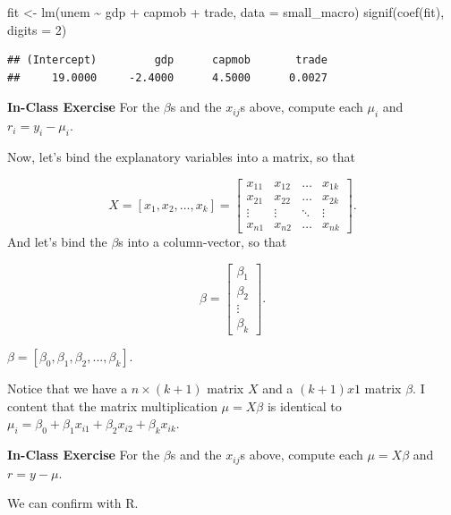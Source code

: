 \documentclass[
]{book}
\newenvironment{Shaded}{\begin{snugshade}}{\end{snugshade}}
\newcommand{\AttributeTok}[1]{\textcolor[rgb]{0.77,0.63,0.00}{#1}}
\newcommand{\DecValTok}[1]{\textcolor[rgb]{0.00,0.00,0.81}{#1}}
\newcommand{\FunctionTok}[1]{\textcolor[rgb]{0.00,0.00,0.00}{#1}}
\newcommand{\NormalTok}[1]{#1}
\newcommand{\OtherTok}[1]{\textcolor[rgb]{0.56,0.35,0.01}{#1}}
\newcommand{\SpecialCharTok}[1]{\textcolor[rgb]{0.00,0.00,0.00}{#1}}
\begin{document}
\begin{Shaded}
\begin{Highlighting}[]
\NormalTok{fit }\OtherTok{\textless{}{-}} \FunctionTok{lm}\NormalTok{(unem }\SpecialCharTok{\textasciitilde{}}\NormalTok{ gdp }\SpecialCharTok{+}\NormalTok{ capmob }\SpecialCharTok{+}\NormalTok{ trade, }\AttributeTok{data =}\NormalTok{ small\_macro)}
\FunctionTok{signif}\NormalTok{(}\FunctionTok{coef}\NormalTok{(fit), }\AttributeTok{digits =} \DecValTok{2}\NormalTok{)}
\end{Highlighting}
\end{Shaded}

\begin{verbatim}
## (Intercept)         gdp      capmob       trade 
##     19.0000     -2.4000      4.5000      0.0027
\end{verbatim}

\textbf{In-Class Exercise} For the \(\beta\)s and the \(x_{ij}\)s above,
compute each \(\mu_i\) and \(r_i = y_i - \mu_i\).

Now, let's bind the explanatory variables into a matrix, so that

\[
X = [x_1, x_2, ..., x_k] = \begin{bmatrix} 
    x_{11} & x_{12} &\dots  & x_{1k}\\
    x_{21} & x_{22} &\dots  & x_{2k}\\
    \vdots & \vdots &\ddots & \vdots\\
    x_{n1} & x_{n2} & \dots  & x_{nk} 
    \end{bmatrix}.
\] And let's bind the \(\beta\)s into a column-vector, so that

\[
\beta = \begin{bmatrix} 
    \beta_{1} \\
    \beta_{2} \\
    \vdots\\
    \beta_{k}  
    \end{bmatrix}.
\]

\(\beta = [\beta_0, \beta_1, \beta_2, ..., \beta_k]\).

Notice that we have a \(n \times (k + 1)\) matrix \(X\) and a
\((k + 1) x 1\) matrix \(\beta\). I content that the matrix
multiplication \(\mu = X\beta\) is identical to
\(\mu_i = \beta_0 + \beta_1 x_{i1} + \beta_2 x_{i2} + \beta_k x_{ik}\).

\textbf{In-Class Exercise} For the \(\beta\)s and the \(x_{ij}\)s above,
compute each \(\mu = X\beta\) and \(r = y - \mu\).

We can confirm with R.
\end{document}
